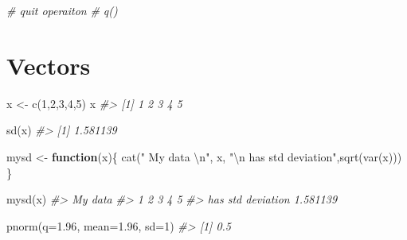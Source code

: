 \documentclass[
]{book}
\newenvironment{Shaded}{\begin{snugshade}}{\end{snugshade}}
\newcommand{\AttributeTok}[1]{\textcolor[rgb]{0.77,0.63,0.00}{#1}}
\newcommand{\CommentTok}[1]{\textcolor[rgb]{0.56,0.35,0.01}{\textit{#1}}}
\newcommand{\ControlFlowTok}[1]{\textcolor[rgb]{0.13,0.29,0.53}{\textbf{#1}}}
\newcommand{\DecValTok}[1]{\textcolor[rgb]{0.00,0.00,0.81}{#1}}
\newcommand{\FloatTok}[1]{\textcolor[rgb]{0.00,0.00,0.81}{#1}}
\newcommand{\FunctionTok}[1]{\textcolor[rgb]{0.00,0.00,0.00}{#1}}
\newcommand{\NormalTok}[1]{#1}
\newcommand{\OtherTok}[1]{\textcolor[rgb]{0.56,0.35,0.01}{#1}}
\newcommand{\SpecialCharTok}[1]{\textcolor[rgb]{0.00,0.00,0.00}{#1}}
\newcommand{\StringTok}[1]{\textcolor[rgb]{0.31,0.60,0.02}{#1}}
\begin{document}
\begin{Shaded}
\begin{Highlighting}[]
\CommentTok{\# quit operaiton}
\CommentTok{\# q() }
\end{Highlighting}
\end{Shaded}

\hypertarget{vectors}{%
\section{Vectors}\label{vectors}}

\begin{Shaded}
\begin{Highlighting}[]
\NormalTok{x }\OtherTok{\textless{}{-}} \FunctionTok{c}\NormalTok{(}\DecValTok{1}\NormalTok{,}\DecValTok{2}\NormalTok{,}\DecValTok{3}\NormalTok{,}\DecValTok{4}\NormalTok{,}\DecValTok{5}\NormalTok{)}
\NormalTok{x}
\CommentTok{\#\textgreater{} [1] 1 2 3 4 5}
\end{Highlighting}
\end{Shaded}

\begin{Shaded}
\begin{Highlighting}[]
\FunctionTok{sd}\NormalTok{(x)}
\CommentTok{\#\textgreater{} [1] 1.581139}
\end{Highlighting}
\end{Shaded}

\begin{Shaded}
\begin{Highlighting}[]
\NormalTok{mysd }\OtherTok{\textless{}{-}} \ControlFlowTok{function}\NormalTok{(x)\{}
  \FunctionTok{cat}\NormalTok{(}\StringTok{" My data }\SpecialCharTok{\textbackslash{}n}\StringTok{"}\NormalTok{, x, }\StringTok{"}\SpecialCharTok{\textbackslash{}n}\StringTok{ has std deviation"}\NormalTok{,}\FunctionTok{sqrt}\NormalTok{(}\FunctionTok{var}\NormalTok{(x)))}
\NormalTok{\}}


\FunctionTok{mysd}\NormalTok{(x)}
\CommentTok{\#\textgreater{}  My data }
\CommentTok{\#\textgreater{}  1 2 3 4 5 }
\CommentTok{\#\textgreater{}  has std deviation 1.581139}
\end{Highlighting}
\end{Shaded}

\begin{Shaded}
\begin{Highlighting}[]
\FunctionTok{pnorm}\NormalTok{(}\AttributeTok{q=}\FloatTok{1.96}\NormalTok{, }\AttributeTok{mean=}\FloatTok{1.96}\NormalTok{, }\AttributeTok{sd=}\DecValTok{1}\NormalTok{)}
\CommentTok{\#\textgreater{} [1] 0.5}
\end{Highlighting}
\end{Shaded}
\end{document}
